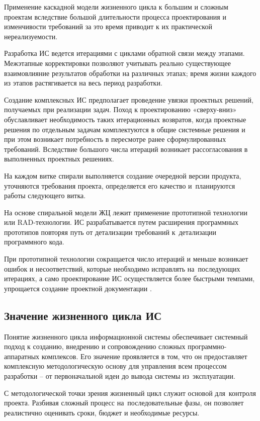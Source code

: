 \documentclass{ou}
\begin{document}
Применение каскадной модели жизненного цикла к большим и сложным проектам вследствие большой длительности процесса проектирования и изменчивости требований за это время приводит к их практической нереализуемости.
 
Разработка ИС ведется итерациями с циклами обратной связи между этапами. Межэтапные корректировки позволяют учитывать реально существующее взаимовлияние результатов обработки на различных этапах; время жизни каждого из этапов растягивается на весь период разработки.

Создание комплексных ИС предполагает проведение увязки проектных решений, получаемых при реализации задач. Поход к проектированию «сверху-вниз» обуславливает необходимость таких итерационных возвратов, когда проектные решения по отдельным задачам комплектуются в общие системные решения и при этом возникает потребность в пересмотре ранее сформулированных требований. Вследствие большого числа итераций возникает рассогласования в выполненных проектных решениях.

На каждом витке спирали выполняется создание очередной версии продукта, уточняются требования проекта, определяется его качество и~планируются работы следующего витка.
 
На основе спиральной модели ЖЦ лежит применение прототипной технологии или RAD-технологии. ИС разрабатывается путем расширения программных прототипов повторяя путь от детализации требований к~детализации программного кода.

При прототипной технологии сокращается число итераций и меньше возникает ошибок и несоответствий, которые необходимо исправлять на~последующих итерациях, а само проектирование ИС осуществляется более быстрыми темпами, упрощается создание проектной документации \cite{cyberleninka_lifecycle}.
\subsection{Значение жизненного цикла ИС}
Понятие жизненного цикла информационной системы обеспечивает системный подход к созданию, внедрению и сопровождению сложных программно-аппаратных комплексов. Его значение проявляется в том, что он предоставляет комплексную методологическую основу для управления всем процессом разработки -- от первоначальной идеи до вывода системы из~эксплуатации\cite{isis_lifecycle}.

С методологической точки зрения жизненный цикл служит основой для~контроля проекта. Разбивая сложный процесс на~последовательные фазы, он позволяет реалистично оценивать сроки, бюджет и необходимые ресурсы. 
\end{document}
